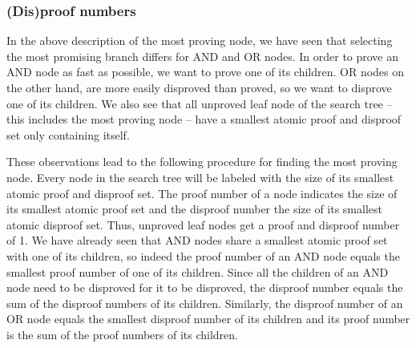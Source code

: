 \documentclass{article}
\begin{document}
\subsubsection*{(Dis)proof numbers}
In the above description of the most proving node, we have seen that selecting the most promising branch differs for AND and OR nodes.
In order to prove an AND node as fast as possible, we want to prove one of its children. OR nodes on the other hand, are more easily disproved than
proved, so we want to disprove one of its children. We also see that all unproved leaf node of the search tree -- this includes the most proving
node -- have a smallest atomic proof and disproof set only containing itself.

These observations lead to the following procedure for finding the most proving node. Every node in the search tree will be labeled with the
size of its smallest atomic proof and disproof set. The proof number of a node indicates the size of its smallest atomic proof set and the disproof number
the size of its smallest atomic disproof set. Thus, unproved leaf nodes get a proof and disproof number of 1. We have already seen that AND nodes share
a smallest atomic proof set with one of its children, so indeed the proof number of an AND node equals the smallest proof number of one of
its children. Since all the children of an AND node need to be disproved for it to be disproved, the disproof number equals the sum of the disproof
numbers of its children. Similarly, the disproof number of an OR node equals the smallest disproof number of its children and its proof number
is the sum of the proof numbers of its children.
\end{document}
